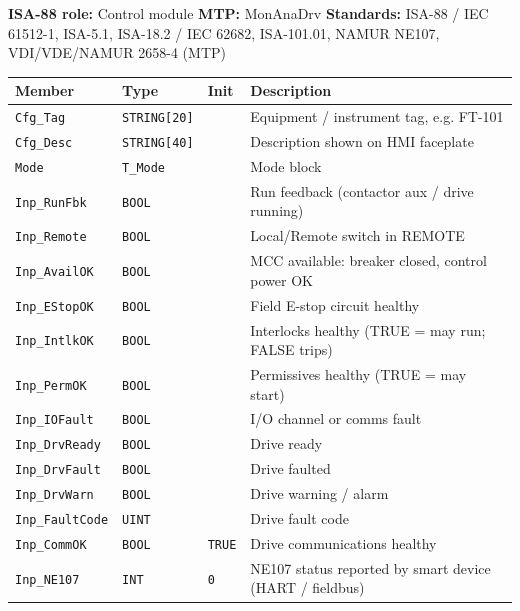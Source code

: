 {\small\textbf{ISA-88 role:} Control module \quad \textbf{MTP:} MonAnaDrv \quad \textbf{Standards:} ISA-88 /\allowbreak{} IEC 61512-1, ISA-5.1, ISA-18.2 /\allowbreak{} IEC 62682, ISA-101.01, NAMUR NE107, VDI/\allowbreak{}VDE/\allowbreak{}NAMUR 2658-4 (MTP)}
{\footnotesize
\begin{longtable}{@{}>{\raggedright\arraybackslash}p{3.4cm}>{\raggedright\arraybackslash}p{3.3cm}>{\raggedright\arraybackslash}p{1.3cm}>{\raggedright\arraybackslash}p{6.4cm}@{}}
\toprule
\rowcolor{tblhead}\textbf{Member} & \textbf{Type} & \textbf{Init} & \textbf{Description} \\
\midrule
\endhead
\texttt{Cfg\_Tag} & \texttt{STRING[20]} &  & Equipment /\allowbreak{} instrument tag, e.g. FT-101 \\
\texttt{Cfg\_Desc} & \texttt{STRING[40]} &  & Description shown on HMI faceplate \\
\texttt{Mode} & \texttt{T\_Mode} &  & Mode block \\
\texttt{Inp\_RunFbk} & \texttt{BOOL} &  & Run feedback (contactor aux /\allowbreak{} drive running) \\
\texttt{Inp\_Remote} & \texttt{BOOL} &  & Local/\allowbreak{}Remote switch in REMOTE \\
\texttt{Inp\_AvailOK} & \texttt{BOOL} &  & MCC available: breaker closed, control power OK \\
\texttt{Inp\_EStopOK} & \texttt{BOOL} &  & Field E-stop circuit healthy \\
\texttt{Inp\_IntlkOK} & \texttt{BOOL} &  & Interlocks healthy (TRUE = may run; FALSE trips) \\
\texttt{Inp\_PermOK} & \texttt{BOOL} &  & Permissives healthy (TRUE = may start) \\
\texttt{Inp\_IOFault} & \texttt{BOOL} &  & I/\allowbreak{}O channel or comms fault \\
\texttt{Inp\_DrvReady} & \texttt{BOOL} &  & Drive ready \\
\texttt{Inp\_DrvFault} & \texttt{BOOL} &  & Drive faulted \\
\texttt{Inp\_DrvWarn} & \texttt{BOOL} &  & Drive warning /\allowbreak{} alarm \\
\texttt{Inp\_FaultCode} & \texttt{UINT} &  & Drive fault code \\
\texttt{Inp\_CommOK} & \texttt{BOOL} & \texttt{TRUE} & Drive communications healthy \\
\texttt{Inp\_NE107} & \texttt{INT} & \texttt{0} & NE107 status reported by smart device (HART /\allowbreak{} fieldbus) \\

\end{longtable}}
